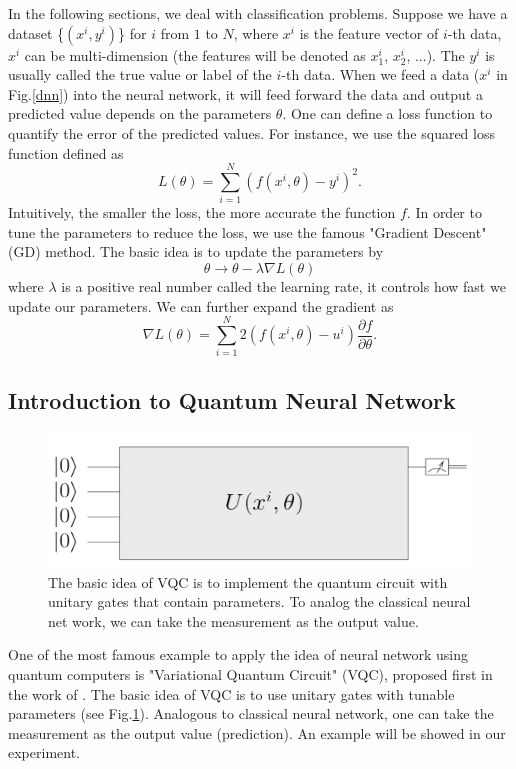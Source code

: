 \documentclass{article}
\begin{document}
In the following sections, we deal with classification problems. Suppose we have a dataset \{$(x^i,y^i)$\} for $i$ from $1$ to $N$, where $x^i$ is the feature vector of $i$-th data, $x^i$ can be multi-dimension (the features will be denoted as $x^i_1$, $x^i_2$, ...). The $y^i$ is usually called the true value or label of the $i$-th data. When we feed a data ($x^i$ in Fig.\ref{dnn}) into the neural network, it will feed forward the data and output a predicted value depends on the parameters $\theta$. One can define a loss function to quantify the error of the predicted values. For instance, we use the squared loss function defined as
\begin{equation}
    L(\theta)=\sum^{N}_{i=1}(f(x^i,\theta)-y^i)^2  .
\end{equation}
Intuitively, the smaller the loss, the more accurate the function $f$. In order to tune the parameters to reduce the loss, we use the famous "Gradient Descent" (GD) method. The basic idea is to update the parameters by
\begin{equation}
    \theta \rightarrow \theta - \lambda \nabla L(\theta)
\end{equation}
where $\lambda$ is a positive real number called the learning rate, it controls how fast we update our parameters. We can further expand the gradient as
\begin{equation} \label{gL}
    \nabla L(\theta)=\sum^{N}_{i=1}2(f(x^i,\theta)-u^i)\frac{\partial f}{\partial \theta}.
\end{equation}

\subsection{Introduction to Quantum Neural Network}
\begin{figure}
    \centering
    \includegraphics[scale=0.5]{vqc.png}
    \caption{The basic idea of VQC is to implement the quantum circuit with unitary gates that contain parameters. To analog the classical neural net work, we can take the measurement as the output value.}
    \label{vqc}
\end{figure}
One of the most famous example to apply the idea of neural network using quantum computers is "Variational Quantum Circuit" (VQC), proposed first in the work of \citet{VQE}. The basic idea of VQC is to use unitary gates with tunable parameters (see Fig.\ref{vqc}). Analogous to classical neural network, one can take the measurement as the output value (prediction). An example will be showed in our experiment.
\end{document}

